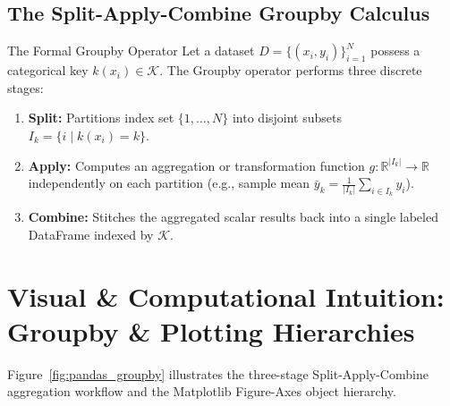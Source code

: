 \subsection{The Split-Apply-Combine Groupby Calculus}

\begin{definitionbox}{The Formal Groupby Operator}
 
Let a dataset $D = \{(x_i, y_i)\}_{i=1}^N$ possess a categorical key $k(x_i) \in \mathcal{K}$. The Groupby operator performs three discrete stages:
\begin{enumerate}
    \item \textbf{Split:} Partitions index set $\{1, \dots, N\}$ into disjoint subsets $I_k = \{i \mid k(x_i) = k\}$.
    \item \textbf{Apply:} Computes an aggregation or transformation function $g: \mathbb{R}^{|I_k|} \to \mathbb{R}$ independently on each partition (e.g., sample mean $\bar{y}_k = \frac{1}{|I_k|} \sum_{i \in I_k} y_i$).
    \item \textbf{Combine:} Stitches the aggregated scalar results back into a single labeled DataFrame indexed by $\mathcal{K}$.
\end{enumerate}
\end{definitionbox}

\section{Visual \& Computational Intuition: Groupby \& Plotting Hierarchies}

Figure~\ref{fig:pandas_groupby} illustrates the three-stage Split-Apply-Combine aggregation workflow and the Matplotlib Figure-Axes object hierarchy.

